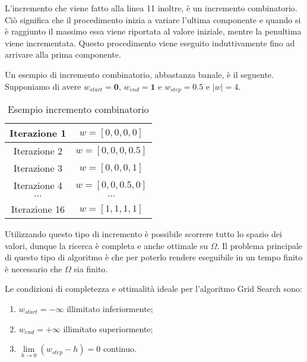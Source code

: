 L'incremento che viene fatto alla linea 11 inoltre, è un incremento
combinatorio. Ciò significa che il procedimento inizia a variare
l'ultima componente e quando si è raggiunto il massimo essa
viene riportata al valore iniziale, mentre la penultima viene incrementata.
Questo procedimento viene eseguito induttivamente fino ad arrivare alla prima
componente.

\begin{esempio}
Un esempio di incremento combinatorio, abbastanza banale, è il seguente.
Supponiamo di avere $w_{start} = \boldsymbol{0}$, $w_{end} = \boldsymbol{1}$
e $w_{step} = 0.5$ e $\left|w\right| = 4$.


\begin{table}[h]
	\centering
	\begin{tabular}{|c|c|}
		\hline
		Iterazione 1 & $w = \left[0, 0, 0, 0\right]$ \\
		\hline
		Iterazione 2 & $w = \left[0, 0, 0, 0.5\right]$ \\
		\hline
		Iterazione 3 & $w = \left[0, 0, 0, 1\right]$ \\
		\hline
		Iterazione 4 & $w = \left[0, 0, 0.5, 0\right]$ \\
		\hline
		$\cdots$ & $\cdots$ \\
		\hline
		Iterazione 16 & $w = \left[1,1,1,1\right]$ \\
		\hline
	\end{tabular}
	\caption{Esempio incremento combinatorio}
\end{table}
\end{esempio}

Utilizzando questo tipo di incremento è possibile scorrere
tutto lo spazio dei valori, dunque la ricerca è completa e anche ottimale
su $\Omega$.
Il problema principale di questo tipo di algoritmo è che
per poterlo rendere eseguibile in un tempo finito
è necessario che $\Omega$ sia finito.

\begin{definizione}
	Le condizioni di completezza e ottimalità ideale per l'algoritmo Grid Search sono:
	\begin{enumerate}
		\item $w_{start} = \boldsymbol{-\infty}$ illimitato inferiormente;
		\item $w_{end} = \boldsymbol{+\infty}$ illimitato superiormente;
		\item $\lim\limits_{h \to 0} \left(w_{step} - h\right) = 0$ continuo.
	\end{enumerate}
\end{definizione}

